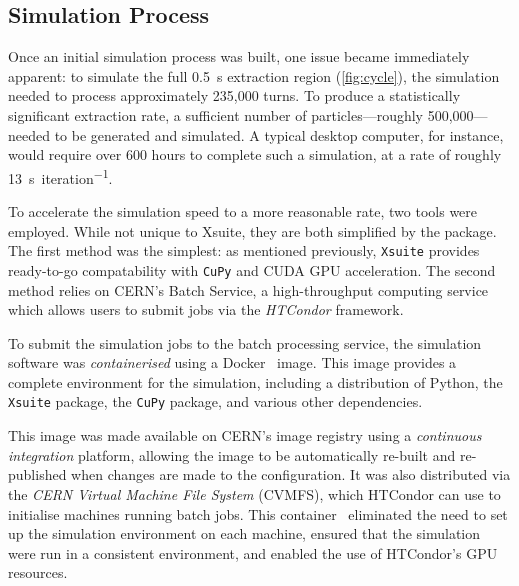 \documentclass[11pt]{report}
\begin{document}
\subsection{Simulation Process}\label{sec:sim_process}

Once an initial simulation process was built, one issue became immediately apparent: to simulate the full \qty{0.5}{\second} extraction region (\autoref{fig:cycle}), the simulation needed to process approximately 235,000 turns. To produce a statistically significant extraction rate, a sufficient number of particles---roughly 500,000---needed to be generated and simulated. A typical desktop computer, for instance, would require over 600 hours to complete such a simulation, at a rate of roughly \qty{13}{\second\per iteration}.

To accelerate the simulation speed to a more reasonable rate, two tools were employed. While not unique to Xsuite, they are both simplified by the package. The first method was the simplest: as mentioned previously, \verb|Xsuite| provides ready-to-go compatability with \verb|CuPy| and CUDA GPU acceleration. The second method relies on CERN's Batch Service, a high-throughput computing service which allows users to submit jobs via the \textit{HTCondor} framework. 

To submit the simulation jobs to the batch processing service, the simulation software was \textit{containerised} using a Docker~\cite{merkel2014docker} image. This image provides a complete environment for the simulation, including a distribution of Python, the \verb|Xsuite| package, the \verb|CuPy| package, and various other dependencies. 

This image was made available on CERN's image registry using a \textit{continuous integration} platform, allowing the image to be automatically re-built and re-published when changes are made to the configuration. It was also distributed via the \textit{CERN Virtual Machine File System} (CVMFS), which HTCondor can use to initialise machines running batch jobs. This container~\cite{docker} eliminated the need to set up the simulation environment on each machine, ensured that the simulation were run in a consistent environment, and enabled the use of HTCondor's GPU resources. 
\end{document}
